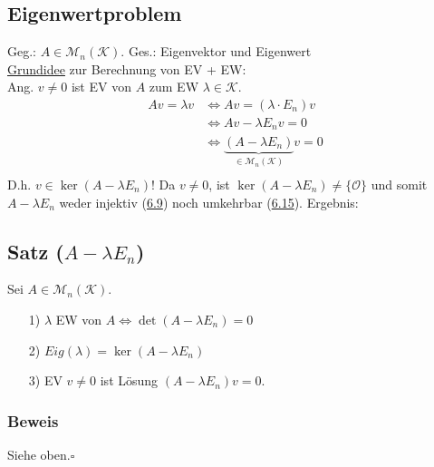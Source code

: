 \documentclass[a4paper, 12pt,titlepage, pdf, headsepline]{article}
\newcommand{\K}{\mathcal{K}}
\newcommand{\M}{\mathcal{M}}
\newcommand{\qed}{\hfill$\square$}
\renewcommand{\>}{\rightarrow}
\renewcommand{\*}{\cdot}
\renewcommand{\O}{\mathcal{O}}
\begin{document}
\subsection*{Eigenwertproblem}
Geg.: $A \in \M_n(\K)$. Ges.: Eigenvektor und Eigenwert \\
\underline{Grundidee} zur Berechnung von EV + EW:\\
Ang. $v \neq 0$ ist EV von $A$ zum EW $\lambda \in \K$.
\begin{align*}
Av = \lambda v &\Leftrightarrow Av=(\lambda \cdot E_n) v\\
&\Leftrightarrow Av - \lambda E_n v = 0 \\
&\Leftrightarrow \underbrace{(A - \lambda E_n)}_{\in \M_n(\K)} v = 0 \\
\end{align*}
D.h. $v \in \ker(A - \lambda E_n)!$ Da $v \neq 0$, ist $\ker(A - \lambda E_n) \neq \{\O\}$ und somit $A - \lambda E_n$ weder injektiv (\hyperref[6.9]{6.9}) noch umkehrbar (\hyperref[6.15]{6.15}). Ergebnis: 
\subsection{Satz ($A-\lambda E_n$)}
\label{9.4}
Sei $A \in \M_n(\K)$.
\begin{itemize}
	\item[1)] $\lambda$ EW von $A \Leftrightarrow \det(A- \lambda E_n) = 0$
	\item[2)] $Eig(\lambda) = \ker(A -\lambda E_n)$
	\item[3)] EV $v \neq 0$ ist Lösung $(A -\lambda E_n)v = 0$.
\end{itemize}
\subsubsection*{Beweis}
Siehe oben.\qed
\end{document}
